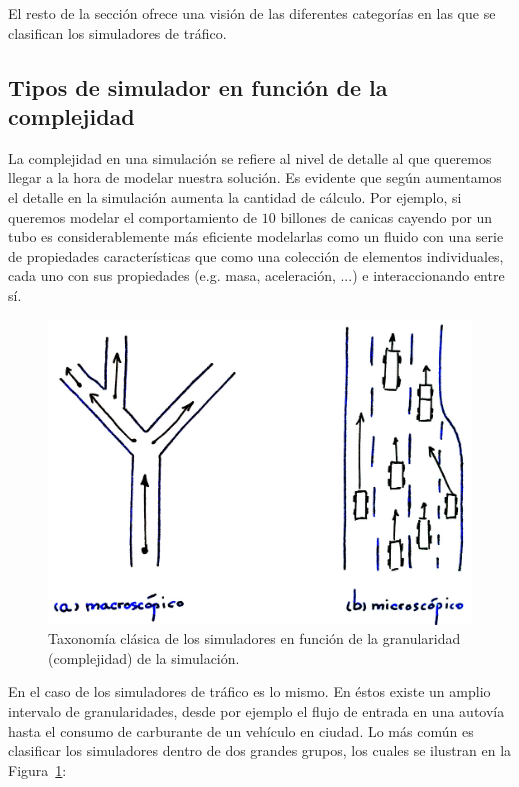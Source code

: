 El resto de la sección ofrece una visión de las diferentes categorías en las que se clasifican los simuladores de tráfico.

\subsection{Tipos de simulador en función de la complejidad}

La complejidad en una simulación se refiere al nivel de detalle al que queremos llegar a la hora de modelar nuestra solución. Es evidente que según aumentamos el detalle en la simulación aumenta la cantidad de cálculo. Por ejemplo, si queremos modelar el comportamiento de $10$ billones de canicas cayendo por un tubo es considerablemente más eficiente modelarlas como un fluido con una serie de propiedades características que como una colección de elementos individuales, cada uno con sus propiedades (e.g. masa, aceleración, ...) e interaccionando entre sí.

\begin{figure}
	\centering
	\includegraphics{images/granularities-in-traffic-simulation}
	\caption{Taxonomía clásica de los simuladores en función de la granularidad (complejidad) de la simulación.}
	\label{fig:granularities-in-traffic-simulation}
\end{figure}

En el caso de los simuladores de tráfico es lo mismo. En éstos existe un amplio intervalo de granularidades, desde por ejemplo el flujo de entrada en una autovía hasta el consumo de carburante de un vehículo en ciudad. Lo más común es clasificar los simuladores dentro de dos grandes grupos, los cuales se ilustran en la Figura~\ref{fig:granularities-in-traffic-simulation}:

